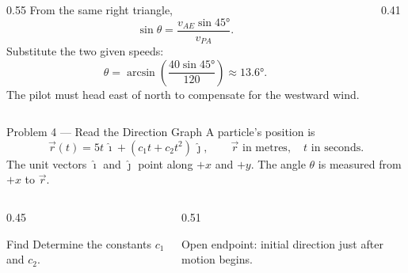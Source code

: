 \begin{solutionframe}
  \begin{columns}[T,onlytextwidth]
    \begin{column}{0.55\textwidth}
      From the same right triangle,
      \[
        \sin\theta=\frac{v_{AE}\sin\ang{45}}{v_{PA}}.
      \]
      Substitute the two given speeds:
      \[
        \theta=\arcsin\!\left(\frac{40\sin\ang{45}}{120}\right)
          \approx\ang{13.6}.
      \]
      The pilot must head east of north to compensate for the westward wind.
    \end{column}
    \begin{column}{0.41\textwidth}
      \centering
      \resizebox{!}{0.44\paperheight}{}
    \end{column}
  \end{columns}
\end{solutionframe}

\begin{frame}{Problem 4 — Read the Direction Graph}
  \small
  A particle's position is
  \[
    \vec r(t)=5t\,\hat{\imath}+(c_1t+c_2t^2)\,\hat{\jmath},
    \qquad \vec r\text{ in metres},\quad t\text{ in seconds}.
  \]
  The unit vectors $\hat{\imath}$ and $\hat{\jmath}$ point along $+x$ and $+y$.
  The angle $\theta$ is measured from $+x$ to $\vec r$.
  \begin{columns}[T,onlytextwidth]
    \begin{column}{0.45\textwidth}
      \centering
      \resizebox{!}{0.36\paperheight}{}
      \begin{block}{Find}
        Determine the constants $c_1$ and $c_2$.
      \end{block}
    \end{column}
    \begin{column}{0.51\textwidth}
      \centering
      \resizebox{!}{0.46\paperheight}{}
      \par\footnotesize
      Open endpoint: initial direction just after motion begins.
    \end{column}
  \end{columns}
\end{frame}

